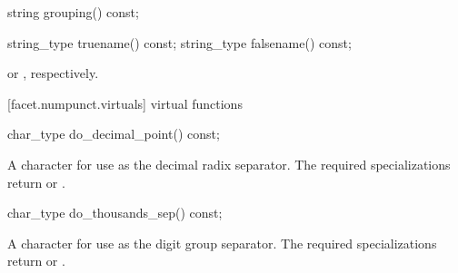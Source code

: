 \begin{itemdescr}
\pnum
\returns
{}
\end{itemdescr}

%
%
\begin{itemdecl}
string grouping()  const;
\end{itemdecl}

\begin{itemdescr}
\pnum
\returns
{}
\end{itemdescr}

%
%
%
%
\begin{itemdecl}
string_type truename()  const;
string_type falsename() const;
\end{itemdecl}

\begin{itemdescr}
\pnum
\returns
{}
or
,
respectively.
\end{itemdescr}

[facet.numpunct.virtuals]{ virtual functions}

%
%
\begin{itemdecl}
char_type do_decimal_point() const;
\end{itemdecl}

\begin{itemdescr}
\pnum
\returns
A character for use as the decimal radix separator.
The required specializations return  or .
\end{itemdescr}

%
%
\begin{itemdecl}
char_type do_thousands_sep() const;
\end{itemdecl}

\begin{itemdescr}
\pnum
\returns
A character for use as the digit group separator.
The required specializations return  or .
\end{itemdescr}

